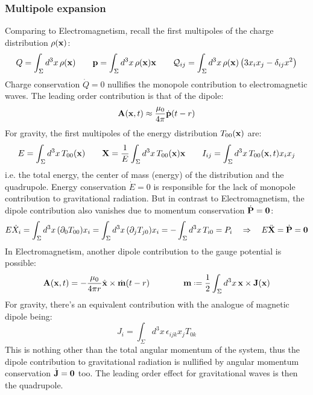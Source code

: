 \subsubsection{Multipole expansion}

Comparing to Electromagnetism, recall the first multipoles of the charge distribution $ \rho(\mathbf{x}) $:
\begin{equation*}
  Q = \int_\Sigma d^3 x\, \rho(\mathbf{x})
  \qquad
  \mathbf{p} = \int_\Sigma d^3 x\, \rho(\mathbf{x}) \mathbf{x}
  \qquad
  \mathcal{Q}_{ij} = \int_\Sigma d^3 x\, \rho(\mathbf{x}) \left( 3 x_i x_j - \delta_{ij} x^2 \right)
\end{equation*}
Charge conservation $ \dot{Q} = 0 $ nullifies the monopole contribution to electromagnetic waves. The leading order contribution is that of the dipole:
\begin{equation*}
  \mathbf{A}(\mathbf{x},t) \approx \frac{\mu_0}{4\pi} \dot{\mathbf{p}}(t - r)
\end{equation*}
For gravity, the first multipoles of the energy distribution $ T_{00}(\mathbf{x}) $ are:
\begin{equation*}
  E = \int_\Sigma d^3 x\, T_{00}(\mathbf{x})
  \qquad
  \mathbf{X} = \frac{1}{E} \int_\Sigma d^3 x\, T_{00}(\mathbf{x}) \mathbf{x}
  \qquad
  I_{ij} = \int_\Sigma d^3 x\, T_{00}(\mathbf{x},t) x_i x_j
\end{equation*}
i.e. the total energy, the center of mass (energy) of the distribution and the quadrupole. Energy conservation $ \dot{E} = 0 $ is responsible for the lack of monopole contribution to gravitational radiation. But in contrast to Electromagnetism, the dipole contribution also vanishes due to momentum conservation $ \dot{\mathbf{P}} = \mathbf{0} $:
\begin{equation*}
  E \dot{X}_i = \int_\Sigma d^3 x\, (\partial_0 T_{00}) x_i = \int_\Sigma d^3 x\, (\partial_j T_{j0}) x_i = - \int_\Sigma d^3 x\, T_{i0} = P_i
  \quad \Rightarrow \quad
  E \ddot{\mathbf{X}} = \dot{\mathbf{P}} = \mathbf{0}
\end{equation*}
In Electromagnetism, another dipole contribution to the gauge potential is possible:
\begin{equation*}
  \ve{A}(\ve{x},t) = -\frac{\mu_0}{4\pi r} \hat{\ve{x}} \times \dot{\ve{m}}(t - r)
  \qquad \qquad
  \ve{m} \defeq \frac{1}{2} \int_\Sigma d^3 x\, \ve{x} \times \ve{J}(\ve{x})
\end{equation*}
For gravity, there's an equivalent contribution with the analogue of magnetic dipole being:
\begin{equation*}
  J_i = \int_\Sigma d^3 x\, \epsilon_{ijk} x_j T_{0k}
\end{equation*}
This is nothing other than the total angular momentum of the system, thus the dipole contribution to gravitational radiation is nullified by angular momentum conservation $ \dot{\mathbf{J}} = \mathbf{0} $ too. The leading order effect for gravitational waves is then the quadrupole.

